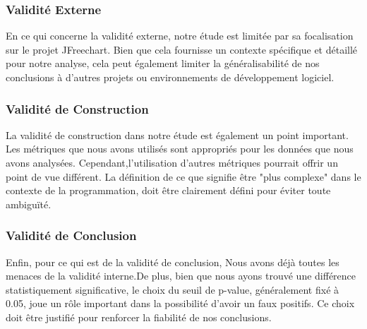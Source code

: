 \documentclass[10pt]{article}
\begin{document}
\subsubsection{Validité Externe}
En ce qui concerne la validité externe, notre étude est limitée par sa focalisation sur le projet JFreechart. Bien que cela fournisse un contexte spécifique et détaillé pour notre analyse, cela peut également limiter la généralisabilité de nos conclusions à d'autres projets ou environnements de développement logiciel.

\subsubsection{Validité de Construction}
La validité de construction dans notre étude est également un point important. Les métriques que nous avons utilisés sont appropriés pour les données que nous avons analysées. Cependant,l'utilisation d'autres métriques pourrait offrir un point de vue différent. La définition de ce que signifie être "plus complexe" dans le contexte de la programmation, doit être clairement défini pour éviter toute ambiguïté.

\subsubsection{Validité de Conclusion}
Enfin, pour ce qui est de la validité de conclusion, Nous avons déjà toutes les menaces de la validité interne.De plus, bien que nous ayons trouvé une différence statistiquement significative, le choix du seuil de p-value, généralement fixé à 0.05, joue un rôle important dans la possibilité d'avoir un faux positifs. Ce choix doit être justifié pour renforcer la fiabilité de nos conclusions.
\end{document}
